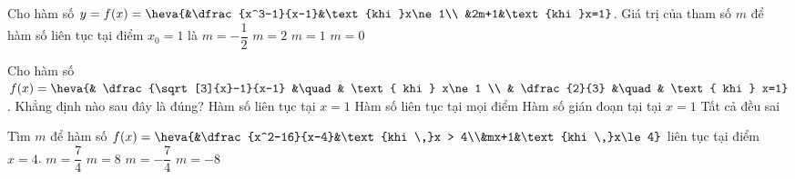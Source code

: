 \begin{ex}%
	 Cho hàm số $y=f(x)=\heva{&\dfrac{x^3-1}{x-1}&\text{khi }x\ne 1\\
	&2m+1&\text{khi }x=1}$. Giá trị của tham  số $m$ để hàm số liên tục tại điểm $x_0=1$ là
	 \choice
		 {$m=-\dfrac{1}{2}$}
		{$m=2$} 
		{\True $m=1$} 
		 {$m=0$}
\end{ex}

\begin{ex}%
	Cho hàm số $f(x)=\heva{& \dfrac{\sqrt[3]{x}-1}{x-1} &\quad& \text{ khi } x\ne 1 \\ & \dfrac{2}{3} &\quad& \text{ khi } x=1}$. Khẳng  định nào sau đây là đúng?
	 \choice
		{Hàm số  liên tục tại $x=1$}
		{Hàm  số liên tục tại mọi điểm}
		{\True Hàm số gián đoạn tại tại $x=1$} 
		 {Tất cả đều sai}
\end{ex}

\begin{ex}%
	Tìm $m$ để hàm số $f(x)=\heva{&\dfrac{x^2-16}{x-4}&\text{khi \,}x > 4\\&mx+1&\text{khi \,}x\le 4}$ liên tục tại điểm  $x=4$.
	\choice 
		 {\True $m=\dfrac{7}{4}$}
		{$m=8$} 
		 {$m=-\dfrac{7}{4}$}
		 {$m=-8$}
\end{ex}

